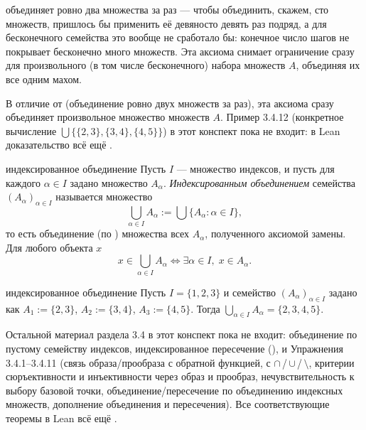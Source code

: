 \begin{intuition}
 объединяет ровно два множества за раз — чтобы объединить, скажем,
сто множеств, пришлось бы применить её девяносто девять раз подряд, а для бесконечного
семейства это вообще не сработало бы: конечное число шагов не покрывает бесконечно много
множеств. Эта аксиома снимает ограничение сразу для произвольного (в том числе бесконечного)
набора множеств $A$, объединяя их все одним махом.
\end{intuition}

\begin{remark}
В отличие от  (объединение ровно двух множеств за раз), эта
аксиома сразу объединяет произвольное множество множеств $A$. Пример 3.4.12 (конкретное
вычисление $\bigcup\{\{2,3\},\{3,4\},\{4,5\}\}$) в этот конспект пока не входит: в Lean
доказательство всё ещё .
\end{remark}

\begin{definition*}{индексированное объединение}
Пусть $I$ — множество индексов, и пусть для каждого $\alpha\in I$ задано множество $A_\alpha$.
\emph{Индексированным объединением} семейства $(A_\alpha)_{\alpha\in I}$ называется множество
\[
  \bigcup_{\alpha\in I} A_\alpha := \bigcup\{A_\alpha : \alpha\in I\},
\]
то есть объединение (по ) множества всех $A_\alpha$, полученного
аксиомой замены. Для любого объекта $x$
\[
  x\in\bigcup_{\alpha\in I}A_\alpha \iff \exists\alpha\in I,\; x\in A_\alpha.
\]
\end{definition*}

\begin{example*}{индексированное объединение}
Пусть $I=\{1,2,3\}$ и семейство $(A_\alpha)_{\alpha\in I}$ задано как $A_1:=\{2,3\}$,
$A_2:=\{3,4\}$, $A_3:=\{4,5\}$. Тогда $\bigcup_{\alpha\in I}A_\alpha = \{2,3,4,5\}$.
\end{example*}

\begin{remark}
Остальной материал раздела 3.4 в этот конспект пока не входит: объединение по пустому
семейству индексов, индексированное пересечение (), и Упражнения 3.4.1–3.4.11
(связь образа/прообраза с обратной функцией, с $\cap$\,/\,$\cup$\,/\,$\setminus$, критерии
сюръективности и инъективности через образ и прообраз, нечувствительность  к
выбору базовой точки, объединение/пересечение по объединению индексных множеств, дополнение
объединения и пересечения). Все соответствующие теоремы в Lean всё ещё .
\end{remark}
